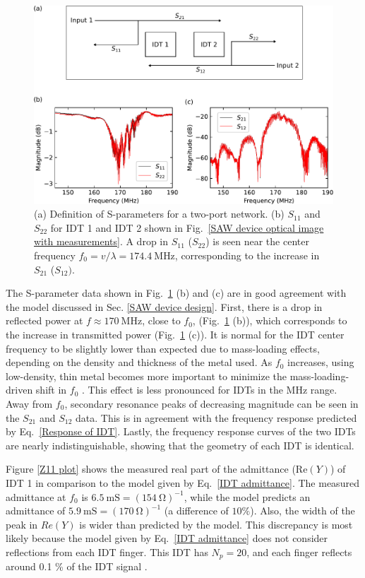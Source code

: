 \documentclass[double,12pt,1in,seploa]{beavtex}
\begin{document}
\begin{figure}
    \includegraphics[width = 1\textwidth]{S-parameters.pdf}
    \caption{(a) Definition of S-parameters for a two-port network. (b) $S_{11}$ and $S_{22}$ for IDT 1 and IDT 2 shown in Fig.\ \ref{SAW device optical image with measurements}. A drop in $S_{11}$ ($S_{22}$) is seen near the center frequency $f_0 = v/\lambda = \SI{174.4}{\mega\hertz}$, corresponding to the increase in $S_{21}$ ($S_{12})$.}
    \label{S-parameters}
\end{figure}
The S-parameter data shown in Fig.\ \ref{S-parameters} (b) and (c) are in good agreement with the model discussed in Sec. \ref{SAW device design}. First, there is a drop in reflected power at $f \approx \SI{170}{\mega\hertz}$, close to $f_0$, (Fig.\ \ref{S-parameters} (b)), which corresponds to the increase in transmitted power (Fig.\ \ref{S-parameters} (c)). It is normal for the IDT center frequency to be slightly lower than expected due to mass-loading effects, depending on the density and thickness of the metal used. As $f_0$ increases, using low-density, thin metal becomes more important to minimize the mass-loading-driven shift in $f_0$ \cite{chen_ultrahigh-frequency_2020}. This effect is less pronounced for IDTs in the MHz range. Away from $f_0$, secondary resonance peaks of decreasing magnitude can be seen in the $S_{21}$ and $S_{12}$ data. This is in agreement with the frequency response predicted by Eq.\ \ref{Response of IDT}. Lastly, the frequency response curves of the two IDTs are nearly indistinguishable, showing that the geometry of each IDT is identical. 

Figure \ref{Z11 plot} shows the measured real part of the admittance ($\mathrm{Re}(Y)$) of IDT 1 in comparison to the model given by Eq.\ \ref{IDT admittance}. The measured admittance at $f_0$ is $\SI{6.5}{\milli\siemens} = (\SI{154}{\ohm})^{-1}$, while the model predicts an admittance of $\SI{5.9}{\milli\siemens} = (\SI{170}{\ohm})^{-1}$ (a difference of $10\%$). Also, the width of the peak in $Re(Y)$ is wider than predicted by the model. This discrepancy is most likely because the model given by Eq.\ \ref{IDT admittance} does not consider reflections from each IDT finger. This IDT has $N_p = 20$, and each finger reflects around 0.1  \% of the IDT signal \cite[p.140]{lane_integrating_2021}.
\end{document}

